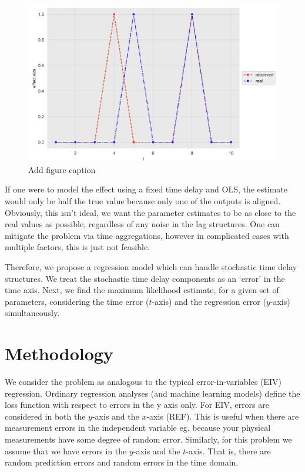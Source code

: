\documentclass[11pt]{amsart}
\begin{document}
\begin{center}
\begin{figure}
\includegraphics[totalheight=6cm]{images/2_input_delay_example.png}
\caption{Add figure caption}
\label{fig:verticalcell}
\end{figure}
\end{center}

If one were to model the effect using a fixed time delay and OLS, the estimate would only be half the true value because only one of the outputs is aligned. Obviously, this isn't ideal, we want the parameter estimates to be as close to the real values as possible, regardless of any noise in the lag structures. One can mitigate the problem via time aggregations, however in complicated cases with multiple factors, this is just not feasible.

Therefore, we propose a regression model which can handle stochastic time delay structures. We treat the stochastic time delay components as an ‘error’ in the time axis. Next, we find the maximum likelihood estimate, for a given set of parameters, considering the time error ($t$-axis) and the regression error ($y$-axis) simultaneously.


\section{Methodology}

We consider the problem as analogous to the typical error-in-variables (EIV) regression. Ordinary regression analyses (and machine learning models) define the loss function with respect to errors in the y axis only. For EIV, errors are considered in both the $y$-axis and the $x$-axis (REF). This is useful when there are measurement errors in the independent variable eg. because your physical measurements have some degree of random error. Similarly, for this problem we assume that we have errors in the $y$-axis and the $t$-axis. That is, there are random prediction errors and random errors in the time domain. 
\end{document}
